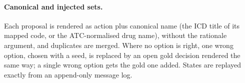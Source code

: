 \documentclass[11pt]{article}
\begin{document}
\paragraph{Canonical and injected sets.} Each proposal is rendered as action plus canonical name (the ICD title of its
mapped code, or the ATC-normalised drug name), without the rationale argument, and duplicates are merged. Where no
option is right, one wrong option, chosen with a seed, is replaced by an open gold decision rendered the same way; a
single wrong option gets the gold one added. States are replayed exactly from an append-only message log.
\end{document}
